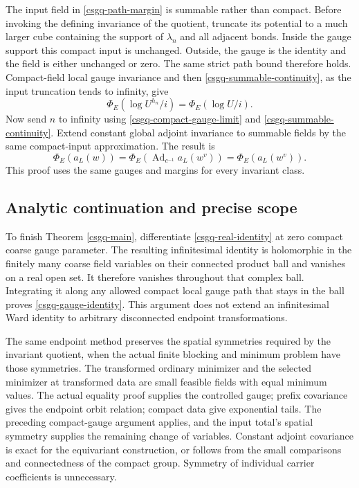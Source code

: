 \documentclass[11pt]{article}
\theoremstyle{remark}
\begin{document}
The input field in \eqref{csgq-path-margin} is summable rather than
compact. Before invoking the defining invariance of the quotient,
truncate its potential to a much larger cube containing the support of
$\lambda_n$ and all adjacent bonds. Inside the gauge support this
compact input is unchanged. Outside, the gauge is the identity and
the field is either unchanged or zero. The same strict path bound
therefore holds. Compact-field local gauge invariance and then
\eqref{csgq-summable-continuity}, as the input truncation tends to
infinity, give
\begin{equation}
              \Phi_E(\log U^{h_n}/i)=\Phi_E(\log U/i).
 \label{csgq-compact-path-identity}
\end{equation}
Now send $n$ to infinity using \eqref{csgq-compact-gauge-limit} and
\eqref{csgq-summable-continuity}. Extend constant global adjoint
invariance to summable fields by the same compact-input approximation.
The result is
\begin{equation}
 \Phi_E(a_L(w))
   =\Phi_E(\operatorname{Ad}_{c^{-1}}a_L(w^v))
   =\Phi_E(a_L(w^v)).
 \label{csgq-real-identity}
\end{equation}
This proof uses the same gauges and margins for every invariant class.

\subsection{Analytic continuation and precise scope}
\label{csgq-scope-section}

To finish Theorem \ref{csgq-main}, differentiate
\eqref{csgq-real-identity} at zero compact coarse gauge parameter.
The resulting infinitesimal identity is holomorphic in the finitely
many coarse field variables on their connected product ball and
vanishes on a real open set. It therefore vanishes throughout that
complex ball. Integrating it along any allowed compact local gauge
path that stays in the ball proves \eqref{csgq-gauge-identity}.
This argument does not extend an infinitesimal Ward identity to
arbitrary disconnected endpoint transformations.

The same endpoint method preserves the spatial symmetries required
by the invariant quotient, when the actual finite blocking and
minimum problem have those symmetries. The transformed ordinary
minimizer and the selected minimizer at transformed data are small
feasible fields with equal minimum values. The actual equality proof
supplies the controlled gauge; prefix covariance gives the endpoint
orbit relation; compact data give exponential tails. The preceding
compact-gauge argument applies, and the input total's spatial symmetry
supplies the remaining change of variables. Constant adjoint covariance
is exact for the equivariant construction, or follows from the small
comparisons and connectedness of the compact group. Symmetry of
individual carrier coefficients is unnecessary.
\end{document}
